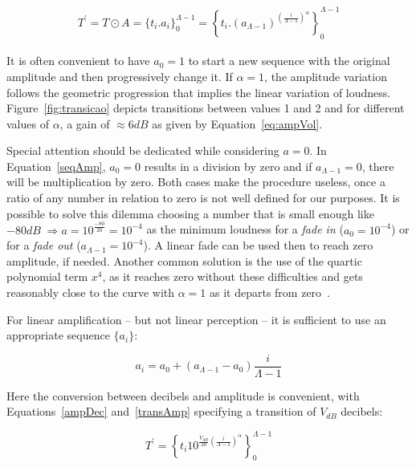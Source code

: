 \begin{equation}\label{transAmp}
\begin{split}
 T^{'}=T \odot A = \{t_i . a_i\}_0^{\Lambda-1} = \left \{ t_i . (a_{\Lambda-1} )^{\left ( \frac{i}{\Lambda-1} \right )^\alpha} \right \}_0^{\Lambda-1}
\end{split}
\end{equation}

It is often convenient to have $a_0=1$ to start a new sequence with the original amplitude and then progressively change it.
If $\alpha=1$, the amplitude variation follows the geometric progression that implies the linear variation of loudness. Figure~\ref{fig:transicao} depicts transitions between values 1 and 2 and for different values of $\alpha$, a gain of $\approx 6dB$ as given by Equation~\ref{eq:ampVol}.

Special attention should be dedicated while considering $a=0$.
In Equation~\ref{seqAmp}, $a_0=0$ results in a division by zero and if $a_{\Lambda-1}=0$, there will be multiplication by zero. Both cases make the procedure useless, once a ratio of any number in relation to zero is not well defined for our purposes. It is possible to solve this dilemma choosing a number that is small enough like $-80dB\;\Rightarrow a=10^{\frac{-80}{20}}=10^{-4}$ as the minimum loudness for a \emph{fade in} ($a_0=10^{-4}$) or for a \emph{fade out} ($a_{\Lambda-1}=10^{-4}$). A linear fade can be used then to reach zero amplitude, if needed. Another common solution is the use of the quartic polynomial term $x^4$, as it reaches zero without these difficulties and gets reasonably close to the curve with $\alpha=1$ as it departs from zero~\cite{Cook}.

For linear amplification -- but not linear perception -- it is sufficient to use an appropriate sequence $\{a_i\}$:

\begin{equation}\label{seqAmpLin}
a_i=a_0 + (a_{\Lambda-1}-a_0)\frac{i}{\Lambda-1}
\end{equation}

Here the conversion between decibels and amplitude is convenient, with Equations~\ref{ampDec} and~\ref{transAmp} specifying a transition of $V_{dB}$ decibels:

\begin{equation}\label{seqAmpDB}
T^{'}=\left\{ t_i 10^{\frac{V_{dB}}{20}\left( \frac{i}{\Lambda-1} \right)^\alpha} \right\}_0^{\Lambda-1}
\end{equation}

